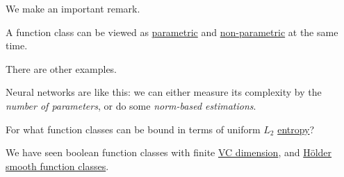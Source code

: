We make an important remark.

\begin{remark}
	A function class can be viewed as \hyperref[def:parametric]{parametric} and \hyperref[def:non-parametric]{non-parametric} at the same time.
\end{remark}

There are other examples.

\begin{eg}
	Neural networks are like this: we can either measure its complexity by the \emph{number of parameters}, or do some \emph{norm-based estimations}.
\end{eg}

\begin{problem*}
	For what function classes can be bound in terms of uniform \(L_2\) \hyperref[def:metric-entropy]{entropy}?
\end{problem*}
\begin{answer}
	We have seen boolean function classes with finite \hyperref[def:VC-dimension]{VC dimension}, and \hyperref[def:Holder-smooth-function-class]{Hölder smooth function classes}.
\end{answer}